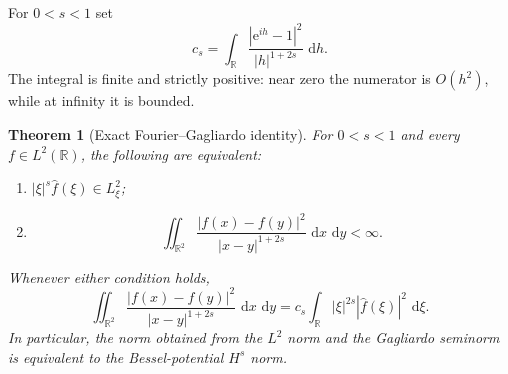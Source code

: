 \documentclass[11pt,oneside]{book}
\newtheorem{theorem}{Theorem}[chapter]
\theoremstyle{definition}
\theoremstyle{remark}
\newcommand{\R}{\mathbb R}
\newcommand{\1}{\mathbf 1}
\newcommand{\dd}{\,\mathrm d}
\newcommand{\e}{\mathrm e}
\begin{document}
For $0<s<1$ set
\[
 c_s=\int_{\R}\frac{|\e^{ih}-1|^2}{|h|^{1+2s}}\,\dd h.
\]
The integral is finite and strictly positive: near zero the numerator is
$O(h^2)$, while at infinity it is bounded.

\begin{theorem}[Exact Fourier--Gagliardo identity]
\label{thm:fourier-gagliardo}
For $0<s<1$ and every $f\in L^2(\R)$, the following are equivalent:
\begin{enumerate}
\item $|\xi|^s\widehat f(\xi)\in L^2_\xi$;
\item
\[
 \iint_{\R^2}\frac{|f(x)-f(y)|^2}{|x-y|^{1+2s}}\,\dd x\,\dd y<\infty.
\]
\end{enumerate}
Whenever either condition holds,
\begin{equation}
 \iint_{\R^2}\frac{|f(x)-f(y)|^2}{|x-y|^{1+2s}}\,\dd x\,\dd y
 =c_s\int_\R|\xi|^{2s}|\widehat f(\xi)|^2\,\dd\xi.
 \label{eq:exact-gagliardo-fourier}
\end{equation}
In particular, the norm obtained from the $L^2$ norm and the Gagliardo
seminorm is equivalent to the Bessel-potential $H^s$ norm.
\end{theorem}
\end{document}
